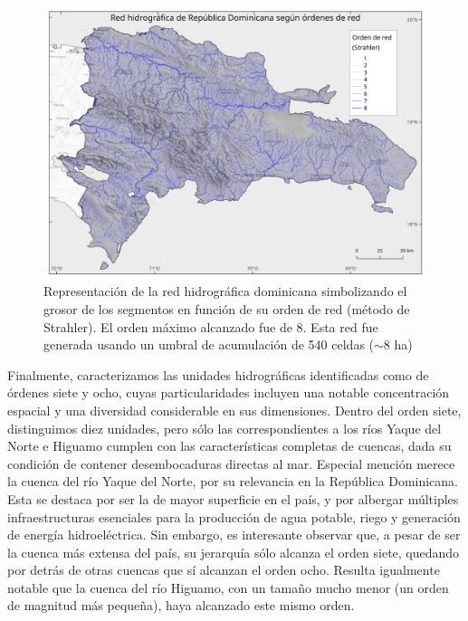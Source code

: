 \documentclass[spanish]{article}
\begin{document}
\begin{figure}

{\centering \includegraphics[width=0.8\linewidth]{figuras/red-orden-nacional} 

}

\caption{Representación de la red hidrográfica dominicana simbolizando el grosor de los segmentos en función de su orden de red (método de Strahler). El orden máximo alcanzado fue de 8. Esta red fue generada usando un umbral de acumulación de 540 celdas ($\sim$8 ha)}\label{fig:redordennacional}
\end{figure}

Finalmente, caracterizamos las unidades hidrográficas identificadas como
de órdenes siete y ocho, cuyas particularidades incluyen una notable
concentración espacial y una diversidad considerable en sus dimensiones.
Dentro del orden siete, distinguimos diez unidades, pero sólo las
correspondientes a los ríos Yaque del Norte e Higuamo cumplen con las
características completas de cuencas, dada su condición de contener
desembocaduras directas al mar. Especial mención merece la cuenca del
río Yaque del Norte, por su relevancia en la República Dominicana. Esta
se destaca por ser la de mayor superficie en el país, y por albergar
múltiples infraestructuras esenciales para la producción de agua
potable, riego y generación de energía hidroeléctrica. Sin embargo, es
interesante observar que, a pesar de ser la cuenca más extensa del país,
su jerarquía sólo alcanza el orden siete, quedando por detrás de otras
cuencas que sí alcanzan el orden ocho. Resulta igualmente notable que la
cuenca del río Higuamo, con un tamaño mucho menor (un orden de magnitud
más pequeña), haya alcanzado este mismo orden.
\end{document}
